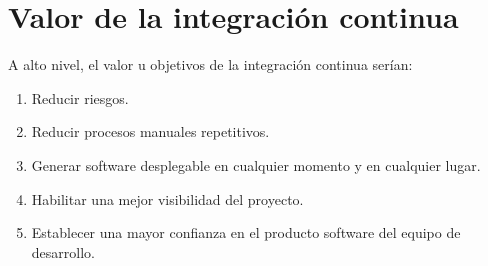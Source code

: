 


\section{Valor de la integración continua}
A alto nivel, el valor u objetivos de la integración continua serían:
\begin{enumerate}
    \item Reducir riesgos.
    \item Reducir procesos manuales repetitivos.
    \item Generar software desplegable en cualquier momento y en cualquier lugar.
    \item Habilitar una mejor visibilidad del proyecto.
    \item Establecer una mayor confianza en el producto software del equipo de desarrollo.
\end{enumerate}
